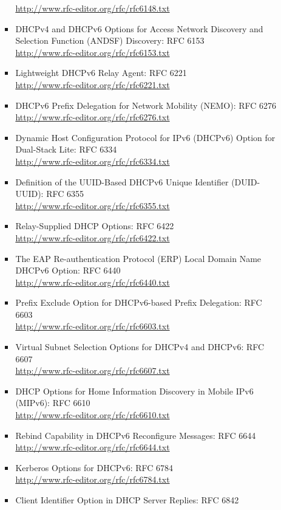 \begin{itemize}
\begin{itemize}
\begin{itemize}
\url{http://www.rfc-editor.org/rfc/rfc6148.txt}
\item DHCPv4 and DHCPv6 Options for Access Network Discovery and 
Selection Function (ANDSF) Discovery: RFC 6153\\
\url{http://www.rfc-editor.org/rfc/rfc6153.txt}
\item Lightweight DHCPv6 Relay Agent: RFC 6221\\
\url{http://www.rfc-editor.org/rfc/rfc6221.txt}
\item DHCPv6 Prefix Delegation for Network Mobility (NEMO): RFC 6276\\
\url{http://www.rfc-editor.org/rfc/rfc6276.txt}
\item Dynamic Host Configuration Protocol for IPv6 (DHCPv6) Option for 
Dual-Stack Lite: RFC 6334\\
\url{http://www.rfc-editor.org/rfc/rfc6334.txt}
\item Definition of the UUID-Based DHCPv6 Unique Identifier (DUID-UUID): 
RFC 6355\\
\url{http://www.rfc-editor.org/rfc/rfc6355.txt}
\item Relay-Supplied DHCP Options: RFC 6422\\
\url{http://www.rfc-editor.org/rfc/rfc6422.txt}
\item The EAP Re-authentication Protocol (ERP) Local Domain Name 
DHCPv6 Option: RFC 6440\\
\url{http://www.rfc-editor.org/rfc/rfc6440.txt}
\item Prefix Exclude Option for DHCPv6-based Prefix Delegation: RFC 6603\\
\url{http://www.rfc-editor.org/rfc/rfc6603.txt}
\item Virtual Subnet Selection Options for DHCPv4 and DHCPv6: RFC 6607\\
\url{http://www.rfc-editor.org/rfc/rfc6607.txt}
\item DHCP Options for Home Information Discovery in Mobile IPv6 (MIPv6): RFC 6610\\
\url{http://www.rfc-editor.org/rfc/rfc6610.txt}
\item Rebind Capability in DHCPv6 Reconfigure Messages: RFC 6644\\
\url{http://www.rfc-editor.org/rfc/rfc6644.txt}
\item Kerberos Options for DHCPv6: RFC 6784\\
\url{http://www.rfc-editor.org/rfc/rfc6784.txt}
\item Client Identifier Option in DHCP Server Replies: RFC 6842\\

\end{itemize}
\end{itemize}
\end{itemize}
